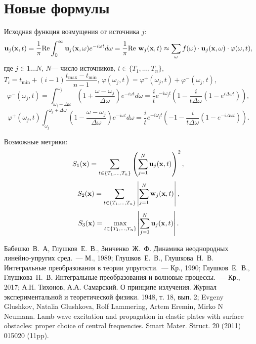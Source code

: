\documentclass[a4paper, 12pt]{article}
\newcommand{\ww}{\omega}
\newcommand{\dw}{\Delta \omega}
\begin{document}
\section{Новые формулы}
Исходная функция возмущения от источника $j$:
\begin{equation*}
    {\bf u}_j({\bf x},t)=\dfrac{1}{\pi} \mathrm{Re} \int_{0}^{\infty} {\bf u}_j({\bf x},\omega) e^{- i \omega t}d\omega=\dfrac{1}{\pi} \mathrm{Re}\ {\bf w}_j ({\bf x},t)\approx \sum_{\omega} f(\omega) \cdot {\bf u}_j({\bf x},\omega) \cdot \varphi (\omega, t) ,
\end{equation*}
где $j \in 1\dots N$, $N$--- число источников, $t \in \{T_1,\dots,T_n\}$, $T_i=t_{\min}+(i-1)\dfrac{t_{\max}-t_{\min}}{n-1}$, $\varphi(\omega_j,t)=\varphi^+(\omega_j,t)+\varphi^-(\omega_j,t)$,
\begin{equation}
    \varphi^-(\omega_j,t)=  \int_{\ww_j-\dw}^{\ww_j} \left(1+ \frac{\ww-\ww_j}{\dw} \right) e^{- i \ww t}d\ww=
    \frac{i}{t} e^{- i \ww_j t}\left(1-\frac{i}{t\dw}\left( 1-e^{i \dw t} \right)  \right), 
\end{equation}
\begin{equation}
    \varphi^+(\omega_j,t) \int_{\ww_j}^{\ww_j+\dw} \left(1- \frac{\ww-\ww_j}{\dw} \right) e^{- i \ww t}d\ww=
\frac{i}{t} e^{- i \ww_j t}\left(-1-\frac{i}{t\dw}\left( 1-e^{-i \dw t} \right)  \right).
\end{equation}


Возможные метрики:
\begin{equation}
    S_1({\bf x} )= \sum_{t \in \{T_1,\dots,T_n\}} \left(\sum_{j=1}^N {\bf u}_j ({\bf x},t)\right)^2 ,
\end{equation}
\begin{equation}
    S_2({\bf x})= \sum_{t \in \{T_1,\dots,T_n\}} \left|\sum_{j=1}^N {\bf w}_j({\bf x},t)\right|,
\end{equation}
\begin{equation}
    S_3({\bf x})= \max_{t \in \{T_1,\dots,T_n\}} \left|\sum_{j=1}^N {\bf u}_j ({\bf x},t)\right|.
\end{equation}


\begin{thebibliography}{999} 
        Бабешко~В.~А, Глушков~Е.~В., Зинченко~Ж.~Ф. Динамика неоднородных линейно-упругих сред.~---
        М., 1989;
        Глушков~Е.~В., Глушкова~Н.~В. Интегральные преобразования в теории упругости.~---
        Кр., 1990;
        Глушков~Е.~В., Глушкова~Н.~В. Интегральные преобразования и волновые процессы.~---
        Кр., 2017;
        А.Н. Тихонов, А.А. Cамарский. О принципе излучения. Журнал экспериментальной и теоретической физики. 1948, т. 18, вып. 2;
        Evgeny Glushkov, Natalia Glushkova, Rolf Lammering, Artem Eremin, Mirko N Neumann.
        Lamb wave excitation and propagation in elastic plates with surface obstacles: proper choice of central frequencies. Smart Mater. Struct. 20 (2011) 015020 (11pp).
\end{thebibliography}
\end{document}
